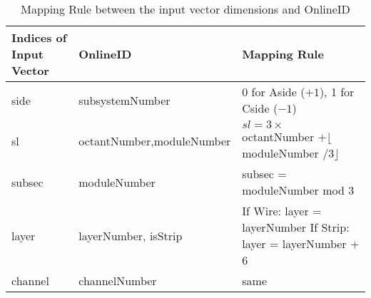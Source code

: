 \begin{table}[htbp]
  \centering
  \caption{Mapping Rule between the input vector dimensions and OnlineID}
  \label{tab:OnlineID_vs_vector}
  \begin{tabular}{|p{3cm}|p{4cm}|p{6cm}|}
    \hline
    \textbf{Indices of \newline Input Vector} & \textbf{OnlineID} & \textbf{Mapping Rule} \\
    \hline
    side & subsystemNumber & 0 for Aside ($+1$), 1 for Cside ($-1$) \\
    \hline
    sl & octantNumber,\newline moduleNumber & $sl = 3 \times$ octantNumber \newline $+ \lfloor$moduleNumber $/ 3\rfloor$ \\
    \hline
    subsec & moduleNumber & subsec = moduleNumber mod 3 \\
    \hline
    layer & layerNumber, isStrip & If Wire: layer = layerNumber \newline If Strip: layer = layerNumber + 6 \\
    \hline
    channel & channelNumber & same \\
    \hline
  \end{tabular}
\end{table}